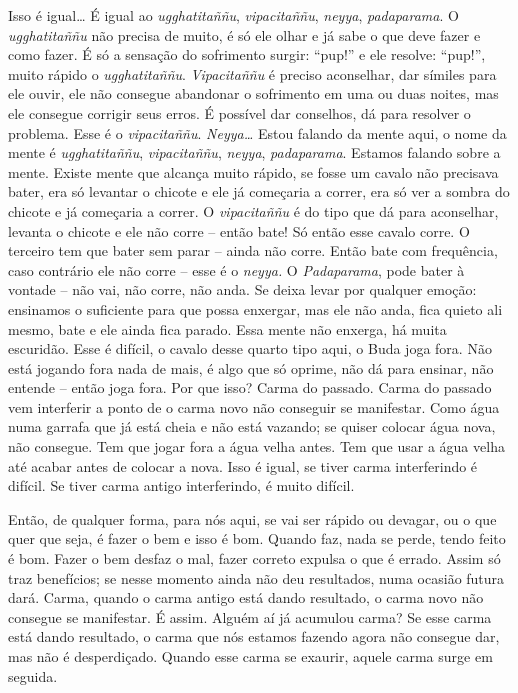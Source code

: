 Isso é igual\ldots{} É igual ao \emph{ugghatitaññu},
\emph{vipacitaññu}, \emph{neyya}, \emph{padaparama}. O
\emph{ugghatitaññu} não precisa de muito, é só ele olhar e já sabe o
que deve fazer e como fazer. É só a sensação do sofrimento surgir:
“pup!” e ele resolve: “pup!”, muito rápido o \emph{ugghatitaññu}.
\emph{Vipacitaññu} é preciso aconselhar, dar símiles para ele ouvir,
ele não consegue abandonar o sofrimento em uma ou duas noites, mas ele
consegue corrigir seus erros. É possível dar conselhos, dá para
resolver o problema. Esse é o \emph{vipacitaññu}. \emph{Neyya\ldots{}}
Estou falando da mente aqui, o nome da mente é \emph{ugghatitaññu},
\emph{vipacitaññu}, \emph{neyya}, \emph{padaparama}. Estamos
falando sobre a mente. Existe mente que alcança muito rápido, se fosse
um cavalo não precisava bater, era só levantar o chicote e ele já
começaria a correr, era só ver a sombra do chicote e já começaria a
correr. O \emph{vipacitaññu} é do tipo que dá para aconselhar,
levanta o chicote e ele não corre – então bate! Só então esse cavalo
corre. O terceiro tem que bater sem parar – ainda não corre. Então bate
com frequência, caso contrário ele não corre – esse é o \emph{neyya.}
O \emph{Padaparama}, pode bater à vontade – não vai, não corre, não
anda. Se deixa levar por qualquer emoção: ensinamos o suficiente para
que possa enxergar, mas ele não anda, fica quieto ali mesmo, bate e ele
ainda fica parado. Essa mente não enxerga, há muita escuridão. Esse é
difícil, o cavalo desse quarto tipo aqui, o Buda joga fora. Não está
jogando fora nada de mais, é algo que só oprime, não dá para ensinar,
não entende – então joga fora. Por que isso? Carma do passado. Carma do
passado vem interferir a ponto de o carma novo não conseguir se
manifestar. Como água numa garrafa que já está cheia e não está
vazando; se quiser colocar água nova, não consegue. Tem que jogar fora
a água velha antes. Tem que usar a água velha até acabar antes de
colocar a nova. Isso é igual, se tiver carma interferindo é difícil. Se
tiver carma antigo interferindo, é muito difícil. 

Então, de qualquer forma, para nós aqui, se vai ser rápido ou
devagar, ou o que quer que seja, é fazer o bem e isso é bom. Quando
faz, nada se perde, tendo feito é bom. Fazer o bem desfaz o mal, fazer
correto expulsa o que é errado. Assim só traz benefícios; se nesse
momento ainda não deu resultados, numa ocasião futura dará. Carma,
quando o carma antigo está dando resultado, o carma novo não consegue
se manifestar. É assim. Alguém aí já acumulou carma? Se esse carma está
dando resultado, o carma que nós estamos fazendo agora não consegue
dar, mas não é desperdiçado. Quando esse carma se exaurir, aquele carma
surge em seguida.

